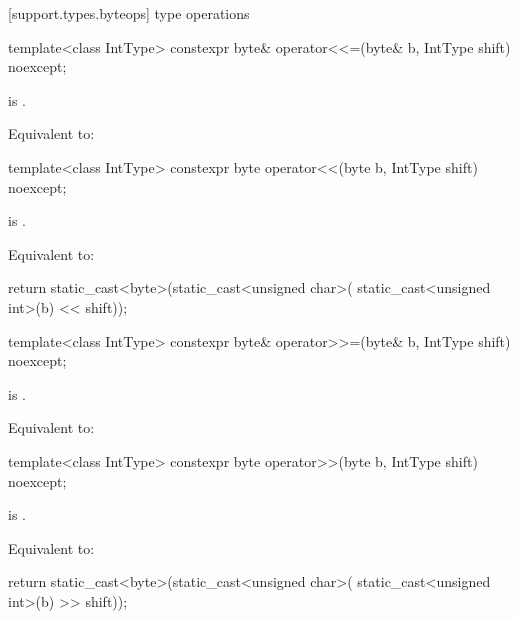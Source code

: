 
[support.types.byteops]{ type operations}

%
\begin{itemdecl}
template<class IntType>
  constexpr byte& operator<<=(byte& b, IntType shift) noexcept;
\end{itemdecl}

\begin{itemdescr}
\pnum
\constraints
{} is .

\pnum
\effects
Equivalent to:
\end{itemdescr}

%
\begin{itemdecl}
template<class IntType>
  constexpr byte operator<<(byte b, IntType shift) noexcept;
\end{itemdecl}

\begin{itemdescr}
\pnum
\constraints
{} is .

\pnum
\effects
Equivalent to:
\begin{codeblock}
return static_cast<byte>(static_cast<unsigned char>(
	                   static_cast<unsigned int>(b) << shift));
\end{codeblock}
\end{itemdescr}

%
\begin{itemdecl}
template<class IntType>
  constexpr byte& operator>>=(byte& b, IntType shift) noexcept;
\end{itemdecl}

\begin{itemdescr}
\pnum
\constraints
{} is .

\pnum
\effects
Equivalent to:
\end{itemdescr}

%
\begin{itemdecl}
template<class IntType>
  constexpr byte operator>>(byte b, IntType shift) noexcept;
\end{itemdecl}

\begin{itemdescr}
\pnum
\constraints
{} is .

\pnum
\effects
Equivalent to:
\begin{codeblock}
return static_cast<byte>(static_cast<unsigned char>(
	                   static_cast<unsigned int>(b) >> shift));
\end{codeblock}
\end{itemdescr}

